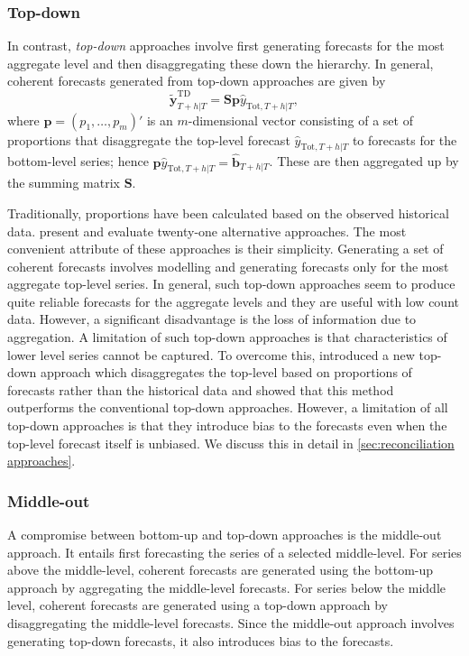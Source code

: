 \documentclass[a4paper, 11pt]{article}
\begin{document}
\subsubsection{Top-down}

In contrast, \textit{top-down} approaches involve first generating forecasts for the most aggregate level and then disaggregating these down the hierarchy. In general, coherent forecasts generated from top-down approaches are given by
\begin{equation*}
\tilde{\bm{y}}^{\text{TD}}_{T+h|T}=\bm{S}\bm{p}\hat{y}_{\text{Tot}, T+h|T},
\end{equation*}
where $\bm{p} = (p_1,\dots,p_m)'$ is an $m$-dimensional vector consisting of a set of proportions that disaggregate the top-level forecast $\hat{y}_{\text{Tot}, T+h|T}$ to forecasts for the bottom-level series; hence $\bm{p}\hat{y}_{\text{Tot}, T+h|T}=\bm{\hat{\bm{b}}}_{T+h|T}$. These are then aggregated up by the summing matrix $\bm{S}$.

Traditionally, proportions have been calculated based on the observed historical data. \citet{gross1990} present and evaluate twenty-one alternative approaches. The most convenient attribute of these approaches is their simplicity. Generating a set of coherent forecasts involves modelling and generating forecasts only for the most aggregate top-level series. In general, such top-down approaches seem to produce quite reliable forecasts for the aggregate levels and they are useful with low count data. However, a significant disadvantage is the loss of information due to aggregation. A limitation of such top-down approaches is that characteristics of lower level series cannot be captured. To overcome this, \citet{AthEtAl2009} introduced a new top-down approach which disaggregates the top-level based on proportions of forecasts rather than the historical data and showed that this method outperforms the conventional top-down approaches. However, a limitation of all top-down approaches is that they introduce bias to the forecasts even when the top-level forecast itself is unbiased. We discuss this in detail in \autoref{sec:reconciliation approaches}.

\subsubsection{Middle-out}

A compromise between bottom-up and top-down approaches is the middle-out approach. It entails first forecasting the series of a selected middle-level. For series above the middle-level, coherent forecasts are generated using the bottom-up approach by aggregating the middle-level forecasts. For series below the middle level, coherent forecasts are generated using a top-down approach by disaggregating the middle-level forecasts. Since the middle-out approach involves generating top-down forecasts, it also introduces bias to the forecasts.
\end{document}
